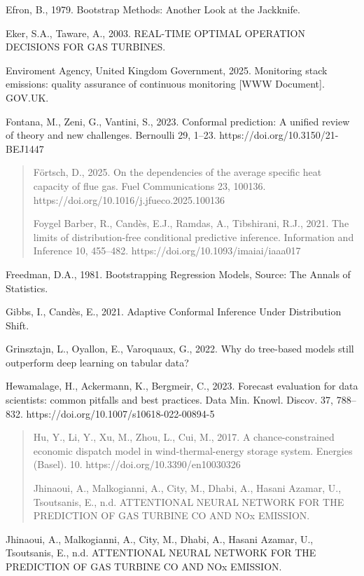 \documentclass[11pt]{article}
\begin{document}
Efron, B., 1979. Bootstrap Methods: Another Look at the Jackknife.

Eker, S.A., Taware, A., 2003. REAL-TIME OPTIMAL OPERATION DECISIONS FOR
GAS TURBINES.

Enviroment Agency, United Kingdom Government, 2025. Monitoring stack
emissions: quality assurance of continuous monitoring {[}WWW
Document{]}. GOV.UK.

Fontana, M., Zeni, G., Vantini, S., 2023. Conformal prediction: A
unified review of theory and new challenges. Bernoulli 29, 1--23.
https://doi.org/10.3150/21-BEJ1447

\begin{quote}
Förtsch, D., 2025. On the dependencies of the average specific heat
capacity of flue gas. Fuel Communications 23, 100136.
https://doi.org/10.1016/j.jfueco.2025.100136

Foygel Barber, R., Candès, E.J., Ramdas, A., Tibshirani, R.J., 2021. The
limits of distribution-free conditional predictive inference.
Information and Inference 10, 455--482.
https://doi.org/10.1093/imaiai/iaaa017
\end{quote}

Freedman, D.A., 1981. Bootstrapping Regression Models, Source: The
Annals of Statistics.

Gibbs, I., Candès, E., 2021. Adaptive Conformal Inference Under
Distribution Shift.

Grinsztajn, L., Oyallon, E., Varoquaux, G., 2022. Why do tree-based
models still outperform deep learning on tabular data?

Hewamalage, H., Ackermann, K., Bergmeir, C., 2023. Forecast evaluation
for data scientists: common pitfalls and best practices. Data Min.
Knowl. Discov. 37, 788--832. https://doi.org/10.1007/s10618-022-00894-5

\begin{quote}
Hu, Y., Li, Y., Xu, M., Zhou, L., Cui, M., 2017. A chance-constrained
economic dispatch model in wind-thermal-energy storage system. Energies
(Basel). 10. https://doi.org/10.3390/en10030326

Jhinaoui, A., Malkogianni, A., City, M., Dhabi, A., Hasani Azamar, U.,
Tsoutsanis, E., n.d. ATTENTIONAL NEURAL NETWORK FOR THE PREDICTION OF
GAS TURBINE CO AND NOx EMISSION.
\end{quote}

Jhinaoui, A., Malkogianni, A., City, M., Dhabi, A., Hasani Azamar, U.,
Tsoutsanis, E., n.d. ATTENTIONAL NEURAL NETWORK FOR THE PREDICTION OF
GAS TURBINE CO AND NOx EMISSION.
\end{document}
